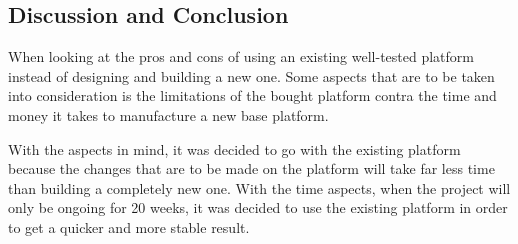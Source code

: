 \subsection{Discussion and Conclusion}\label{lawnmowerDiscussion}
\noindent
 
When looking at the pros and cons of using an existing well-tested platform instead of designing and building a new one. Some aspects that are to be taken into consideration is the limitations of the bought platform contra the time and money it takes to manufacture a new base platform.

With the aspects in mind, it was decided to go with the existing platform because the changes that are to be made on the platform will take far less time than building a completely new one. With the time aspects, when the project will only be ongoing for 20 weeks, it was decided to use the existing platform in order to get a quicker and more stable result. 





 
 
 







